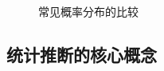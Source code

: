 \begin{figure}[ht]
	\begin{minipage}{0.48\textwidth}
		\centering
	\end{minipage}
	\hfill
	\begin{minipage}{0.48\textwidth}
		\centering
	\end{minipage}
	
	\caption{常见概率分布的比较}
	\label{fig:distributions}
\end{figure}

\subsection{统计推断的核心概念}

